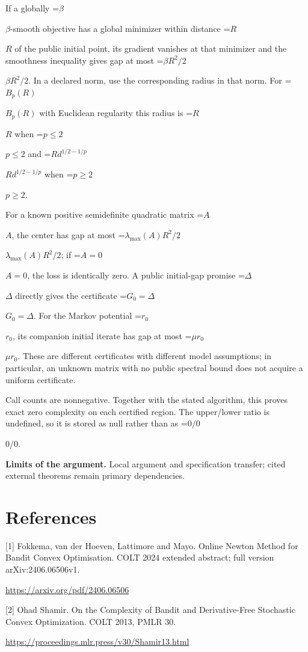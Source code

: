 \documentclass[10pt,a4paper]{article}
\newcommand{\AtlasMath}[1]{\par\begingroup\centering\setbox0=\hbox{$\displaystyle #1$}\ifdim\wd0>1.4\linewidth\typeout{ATLAS WIDE FORMULA: \the\wd0}\fi\ifdim\wd0>\linewidth\resizebox{\linewidth}{!}{\box0}\else\box0\fi\par\endgroup}
\newcommand{\AtlasInlineMath}[1]{\begingroup\setbox0=\hbox{$#1$}\ifdim\wd0>.4\linewidth\endgroup\AtlasMath{#1}\else\endgroup$#1$\fi}
\begin{document}
If a globally \AtlasInlineMath{\beta}-smooth objective has a global minimizer within distance \AtlasInlineMath{R} of the public initial point, its gradient vanishes at that minimizer and the smoothness inequality gives gap at most \AtlasInlineMath{\beta R^2/2}. In a declared norm, use the corresponding radius in that norm. For \AtlasInlineMath{B_p(R)} with Euclidean regularity this radius is \AtlasInlineMath{R} when \AtlasInlineMath{p\le2} and \AtlasInlineMath{R d^{1/2-1/p}} when \AtlasInlineMath{p\ge2}.

For a known positive semidefinite quadratic matrix \AtlasInlineMath{A}, the center has gap at most \AtlasInlineMath{\lambda_{\max}(A)R^2/2}; if \AtlasInlineMath{A=0}, the loss is identically zero. A public initial-gap promise \AtlasInlineMath{\Delta} directly gives the certificate \AtlasInlineMath{G_0=\Delta}. For the Markov potential \AtlasInlineMath{r_0}, its companion initial iterate has gap at most \AtlasInlineMath{\mu r_0}. These are different certificates with different model assumptions; in particular, an unknown matrix with no public spectral bound does not acquire a uniform certificate.

Call counts are nonnegative. Together with the stated algorithm, this proves exact zero complexity on each certified region. The upper/lower ratio is undefined, so it is stored as null rather than as \AtlasInlineMath{0/0}.

\textbf{Limits of the argument.} Local argument and specification transfer; cited external theorems remain primary dependencies.

\section{References}
[1] Fokkema, van der Hoeven, Lattimore and Mayo. Online Newton Method for Bandit Convex Optimisation. COLT 2024 extended abstract; full version arXiv:2406.06506v1.

\url{https://arxiv.org/pdf/2406.06506}

[2] Ohad Shamir. On the Complexity of Bandit and Derivative-Free Stochastic Convex Optimization. COLT 2013, PMLR 30.

\url{https://proceedings.mlr.press/v30/Shamir13.html}
\end{document}
